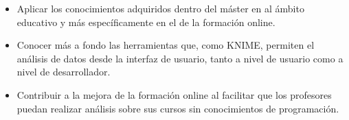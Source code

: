 \begin{itemize}
	\item Aplicar los conocimientos adquiridos dentro del máster en al ámbito educativo y más específicamente en el de la formación online. 
	\item Conocer más a fondo las herramientas que, como KNIME, permiten el análisis de datos desde la interfaz de usuario, tanto a nivel de usuario como a nivel de desarrollador. 
    \item Contribuir a la mejora de la formación online al facilitar que los profesores puedan realizar análisis sobre sus cursos sin conocimientos de programación. 
\end{itemize}
